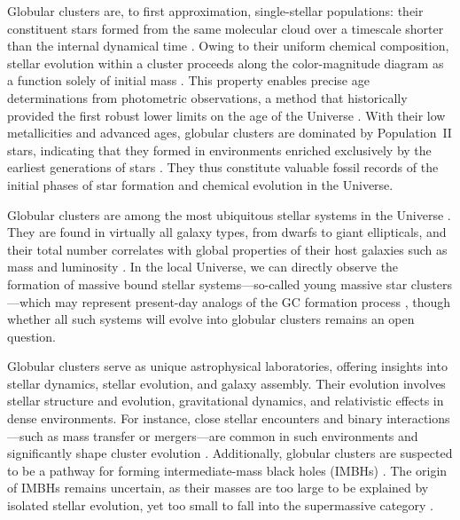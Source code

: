     Globular clusters are, to first approximation, single-stellar populations: their constituent stars formed from the same molecular cloud over a timescale shorter than the internal dynamical time \citep{1988ApJ...324..288A,2009MNRAS.397..954F,2014PhR...539...49K}. Owing to their uniform chemical composition, stellar evolution within a cluster proceeds along the color-magnitude diagram as a function solely of initial mass \citep{2013sse..book.....K}. This property enables precise age determinations from photometric observations, a method that historically provided the first robust lower limits on the age of the Universe \citep{1959MNRAS.119..124H,1970ApJ...162..841S,1985A&A...147..169G,1992ApJ...400..265M}. With their low metallicities and advanced ages, globular clusters are dominated by Population~II stars, indicating that they formed in environments enriched exclusively by the earliest generations of stars \citep{2022A&A...668A.191C}. They thus constitute valuable fossil records of the initial phases of star formation and chemical evolution in the Universe.
    
    Globular clusters are among the most ubiquitous stellar systems in the Universe \citep{2006ARA&A..44..193B,2019ARA&A..57..227K}. They are found in virtually all galaxy types, from dwarfs to giant ellipticals, and their total number correlates with global properties of their host galaxies such as mass and luminosity \citep[e.g.,][]{2013ApJ...772...82H,2018MNRAS.481.5592F}. In the local Universe, we can directly observe the formation of massive bound stellar systems—so-called young massive star clusters—which may represent present-day analogs of the GC formation process \citep[e.g.,][]{2010ARA&A..48..431P,2020SSRv..216...69A}, though whether all such systems will evolve into globular clusters remains an open question.

    Globular clusters serve as unique astrophysical laboratories, offering insights into stellar dynamics, stellar evolution, and galaxy assembly. Their evolution involves stellar structure and evolution, gravitational dynamics, and relativistic effects in dense environments. For instance, close stellar encounters and binary interactions—such as mass transfer or mergers—are common in such environments and significantly shape cluster evolution \citep{2004MNRAS.349..129D,2016MNRAS.458.1450W,2024MNRAS.528.5119A}. Additionally, globular clusters are suspected to be a pathway for forming intermediate-mass black holes (IMBHs) \citep{2013MNRAS.432.2779B,2015MNRAS.454.3150G}. The origin of IMBHs remains uncertain, as their masses are too large to be explained by isolated stellar evolution, yet too small to fall into the supermassive category \citep{2020ARA&A..58..257G}. 
    
